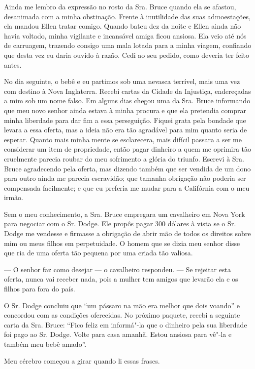 Ainda me lembro da expressão no rosto
da Sra. Bruce quando ela se afastou, desanimada com a minha obstinação.
Frente à inutilidade das suas admoestações, ela mandou Ellen tratar
comigo. Quando bateu dez da noite e Ellen ainda não havia voltado, minha
vigilante e incansável amiga ficou ansiosa. Ela veio até nós de
carruagem, trazendo consigo uma mala lotada para a minha viagem,
confiando que desta vez eu daria ouvido à razão. Cedi ao seu pedido,
como deveria ter feito antes.

No dia seguinte, o bebê e eu partimos
sob uma nevasca terrível, mais uma vez com destino à Nova Inglaterra.
Recebi cartas da Cidade da Injustiça, endereçadas a mim sob um nome
falso. Em alguns dias chegou uma da Sra. Bruce informando que meu novo
senhor ainda estava à minha procura e que ela pretendia comprar minha
liberdade para dar fim a essa perseguição. Fiquei grata pela bondade que
levara a essa oferta, mas a ideia não era tão agradável para mim quanto
seria de esperar. Quanto mais minha mente se esclarecera, mais difícil
passara a ser me considerar um item de propriedade, então pagar dinheiro
a quem me oprimira tão cruelmente parecia roubar do meu sofrimento a
glória do triunfo. Escrevi à Sra. Bruce agradecendo pela oferta, mas
dizendo também que ser vendida de um dono para outro ainda me parecia
escravidão; que tamanha obrigação não poderia ser compensada facilmente;
e que eu preferia me mudar para a Califórnia com o meu irmão.

Sem o meu conhecimento, a Sra. Bruce
empregara um cavalheiro em Nova York para negociar com o Sr. Dodge. Ele
propôs pagar 300 dólares à vista se o Sr. Dodge me vendesse e firmasse a
obrigação de abrir mão de todos os direitos sobre mim ou meus filhos em
perpetuidade. O homem que se dizia meu senhor disse que ria de uma
oferta tão pequena por uma criada tão valiosa.

--- O senhor faz como desejar --- o cavalheiro respondeu. --- Se
rejeitar esta oferta, nunca vai receber nada, pois a mulher tem amigos
que levarão ela e os filhos para fora do país.

O Sr. Dodge concluiu que ``um pássaro
na mão era melhor que dois voando'' e concordou com as condições
oferecidas. No próximo paquete, recebi a seguinte carta da Sra. Bruce:
``Fico feliz em informá"-la que o dinheiro pela sua liberdade foi pago ao
Sr. Dodge. Volte para casa amanhã. Estou ansiosa para vê"-la e também meu
bebê amado''.

Meu cérebro começou a girar quando li
essas frases.

